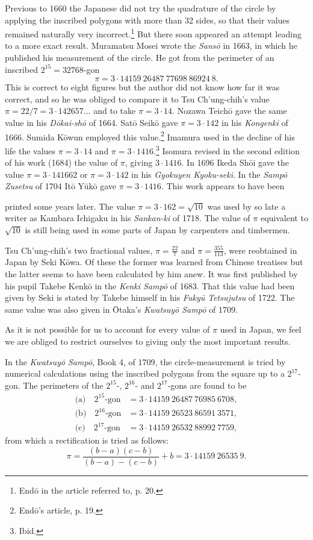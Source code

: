 \documentclass[11pt]{article}
\newcommand{\scanpage}[2]{\clearpage\setcounter{footnote}{0}\noindent{\footnotesize\color{gray}PDF page #1 · #2}\par\medskip}
\newcommand{\scanfooter}{}
\begin{document}
Previous to 1660 the Japanese did not try the quadrature of the circle by applying the inscribed polygons with more than 32 sides, so that their values remained naturally very incorrect.\footnote{Endō in the article referred to, p. 20.} But there soon appeared an attempt leading to a more exact result. Muramatsu Mosei wrote the \emph{Sansō} in 1663, in which he published his measurement of the circle. He got from the perimeter of an inscribed $2^{15}=32768$-gon
\[
\pi=3\cdot14159\ 26487\ 77698\ 86924\ 8.
\]
This is correct to eight figures but the author did not know how far it was correct, and so he was obliged to compare it to Tsu Ch'ung-chih's value $\pi=22/7=3\cdot142657\ldots$ and to take $\pi=3\cdot14$. Nozawa Teichō gave the same value in his \emph{Dōkai-shō} of 1664. Satō Seikō gave $\pi=3\cdot142$ in his \emph{Kongenki} of 1666. Sumida Kōwun employed this value.\footnote{Endō's article, p. 19.} Imamura used in the decline of his life the values $\pi=3\cdot14$ and $\pi=3\cdot1416$.\footnote{Ibid.} Isomura revised in the second edition of his work (1684) the value of $\pi$, giving $3\cdot1416$. In 1696 Ikeda Shōi gave the value $\pi=3\cdot141662$ or $\pi=3\cdot142$ in his \emph{Gyokuyen Kyoku-seki}. In the \emph{Sampō Zusetsu} of 1704 Itō Yūkō gave $\pi=3\cdot1416$. This work appears to have been
\scanfooter

\scanpage{0215}{Chapter 25, printed page 201}
printed some years later. The value $\pi=3\cdot162=\sqrt{10}$ was used by so late a writer as Kambara Ichigaku in his \emph{Sankan-ki} of 1718. The value of $\pi$ equivalent to $\sqrt{10}$ is still being used in some parts of Japan by carpenters and timbermen.

Tsu Ch'ung-chih's two fractional values, $\pi=\frac{22}{7}$ and $\pi=\frac{355}{113}$, were reobtained in Japan by Seki Kōwa. Of these the former was learned from Chinese treatises but the latter seems to have been calculated by him anew. It was first published by his pupil Takebe Kenkō in the \emph{Kenki Sampō} of 1683. That this value had been given by Seki is stated by Takebe himself in his \emph{Fukyū Tetsujutsu} of 1722. The same value was also given in Ōtaka's \emph{Kwatsuyō Sampō} of 1709.

As it is not possible for us to account for every value of $\pi$ used in Japan, we feel we are obliged to restrict ourselves to giving only the most important results.

In the \emph{Kwatsuyō Sampō}, Book 4, of 1709, the circle-measurement is tried by numerical calculations using the inscribed polygons from the square up to a $2^{17}$-gon. The perimeters of the $2^{15}$-, $2^{16}$- and $2^{17}$-gons are found to be
\[
\begin{aligned}
\text{(a)}\quad 2^{15}\text{-gon}&=3\cdot14159\ 26487\ 76985\ 6708,\\
\text{(b)}\quad 2^{16}\text{-gon}&=3\cdot14159\ 26523\ 86591\ 3571,\\
\text{(c)}\quad 2^{17}\text{-gon}&=3\cdot14159\ 26532\ 88992\ 7759,
\end{aligned}
\]
from which a rectification is tried as follows:
\[
\pi=\frac{(b-a)(c-b)}{(b-a)-(c-b)}+b=3\cdot14159\ 26535\ 9.
\]
\end{document}
